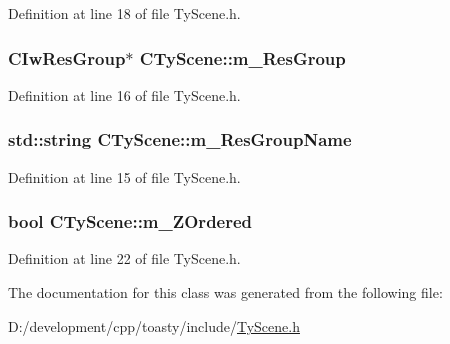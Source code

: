 Definition at line 18 of file TyScene.h.

\hypertarget{class_c_ty_scene_a6630f437b2907d89c8deb4a536483c00}{
\subsubsection[{m\_\-ResGroup}]{\setlength{\rightskip}{0pt plus 5cm}CIwResGroup$\ast$ {\bf CTyScene::m\_\-ResGroup}}}
\label{class_c_ty_scene_a6630f437b2907d89c8deb4a536483c00}


Definition at line 16 of file TyScene.h.

\hypertarget{class_c_ty_scene_a6ea9f4376051cf9f0f7191e0bf5afad5}{
\subsubsection[{m\_\-ResGroupName}]{\setlength{\rightskip}{0pt plus 5cm}std::string {\bf CTyScene::m\_\-ResGroupName}}}
\label{class_c_ty_scene_a6ea9f4376051cf9f0f7191e0bf5afad5}


Definition at line 15 of file TyScene.h.

\hypertarget{class_c_ty_scene_aef04104af22b290a7207b45852be15c1}{
\subsubsection[{m\_\-ZOrdered}]{\setlength{\rightskip}{0pt plus 5cm}bool {\bf CTyScene::m\_\-ZOrdered}}}
\label{class_c_ty_scene_aef04104af22b290a7207b45852be15c1}


Definition at line 22 of file TyScene.h.



The documentation for this class was generated from the following file:\begin{DoxyCompactItemize}
\item 
D:/development/cpp/toasty/include/\hyperlink{_ty_scene_8h}{TyScene.h}\end{DoxyCompactItemize}
